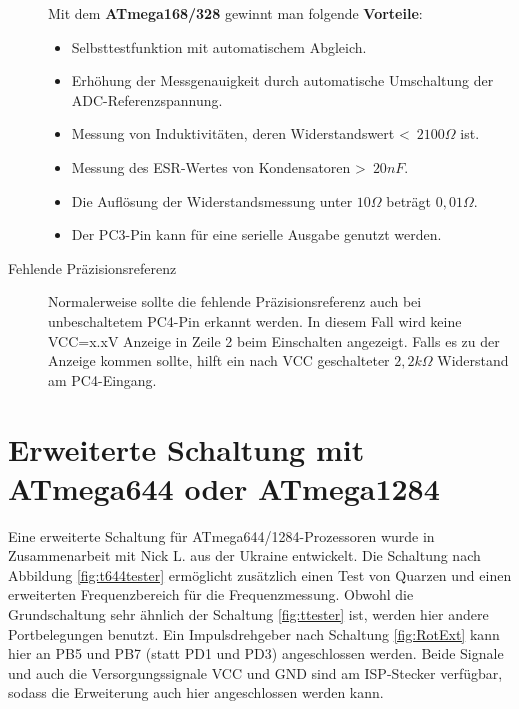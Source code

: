 \begin{description}
Mit dem \textbf {ATmega168/328} gewinnt man folgende \textbf {Vorteile}:
\begin{itemize} \setlength{\itemsep}{-1.0\baselineskip}
 \vspace{-0.5\baselineskip}
 \item Selbsttestfunktion mit automatischem Abgleich.\\
 \item Erhöhung der Messgenauigkeit durch automatische Umschaltung der ADC-Referenzspannung.\\
 \item Messung von Induktivitäten, deren Widerstandswert \textless~\(2100\Omega\) ist.\\
 \item Messung des ESR-Wertes von Kondensatoren \textgreater~\(20nF\).\\
 \item Die Auflösung der Widerstandsmessung unter \(10\Omega\) beträgt \(0,01\Omega\).\\
 \item Der PC3-Pin kann für eine serielle Ausgabe genutzt werden.
\end{itemize}
\vspace{-0.5\baselineskip}
\item[Fehlende Präzisionsreferenz]
Normalerweise sollte die fehlende Präzisionsreferenz auch bei unbeschaltetem PC4-Pin
erkannt werden. In diesem Fall wird keine VCC=x.xV Anzeige in Zeile 2 beim Einschalten
angezeigt. Falls es zu der Anzeige kommen sollte, hilft ein nach VCC geschalteter 
\(2,2k\Omega\) Widerstand am PC4-Eingang.
\end{description}

\section{Erweiterte Schaltung mit ATmega644 oder ATmega1284}

Eine erweiterte Schaltung für ATmega644/1284-Prozessoren wurde in Zusammenarbeit mit Nick L. aus
der Ukraine entwickelt. Die Schaltung nach Abbildung \ref{fig:t644tester} ermöglicht zusätzlich
einen Test von Quarzen und einen erweiterten Frequenzbereich für die Frequenzmessung.
Obwohl die Grundschaltung sehr ähnlich der Schaltung \ref{fig:ttester} ist, werden hier
andere Portbelegungen benutzt.
Ein Impulsdrehgeber nach Schaltung \ref{fig:RotExt} kann hier an PB5 und PB7 (statt PD1 und PD3) angeschlossen werden.
Beide Signale und auch die Versorgungssignale VCC und GND sind am ISP-Stecker verfügbar,
sodass die Erweiterung auch hier angeschlossen werden kann.

